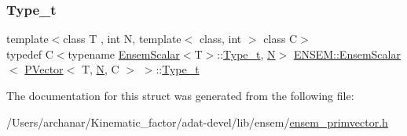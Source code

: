 \mbox{\label{structENSEM_1_1EnsemScalar_3_01PVector_3_01T_00_01N_00_01C_01_4_01_4_a7301e4986b6b626a7c41055ad178ffac}} 
\subsubsection{\texorpdfstring{Type\_t}{Type\_t}\hspace{0.1cm}{\footnotesize\ttfamily [3/3]}}
{\footnotesize\ttfamily template$<$class T , int N, template$<$ class, int $>$ class C$>$ \\
typedef C$<$typename \mbox{\hyperlink{structENSEM_1_1EnsemScalar}{Ensem\+Scalar}}$<$T$>$\+::\mbox{\hyperlink{structENSEM_1_1EnsemScalar_3_01PVector_3_01T_00_01N_00_01C_01_4_01_4_a7301e4986b6b626a7c41055ad178ffac}{Type\+\_\+t}}, \mbox{\hyperlink{adat__devel_2lib_2hadron_2operator__name__util_8cc_a7722c8ecbb62d99aee7ce68b1752f337}{N}}$>$ \mbox{\hyperlink{structENSEM_1_1EnsemScalar}{E\+N\+S\+E\+M\+::\+Ensem\+Scalar}}$<$ \mbox{\hyperlink{classENSEM_1_1PVector}{P\+Vector}}$<$ T, \mbox{\hyperlink{adat__devel_2lib_2hadron_2operator__name__util_8cc_a7722c8ecbb62d99aee7ce68b1752f337}{N}}, C $>$ $>$\+::\mbox{\hyperlink{structENSEM_1_1EnsemScalar_3_01PVector_3_01T_00_01N_00_01C_01_4_01_4_a7301e4986b6b626a7c41055ad178ffac}{Type\+\_\+t}}}



The documentation for this struct was generated from the following file\+:\begin{DoxyCompactItemize}
\item 
/\+Users/archanar/\+Kinematic\+\_\+factor/adat-\/devel/lib/ensem/\mbox{\hyperlink{adat-devel_2lib_2ensem_2ensem__primvector_8h}{ensem\+\_\+primvector.\+h}}\end{DoxyCompactItemize}
